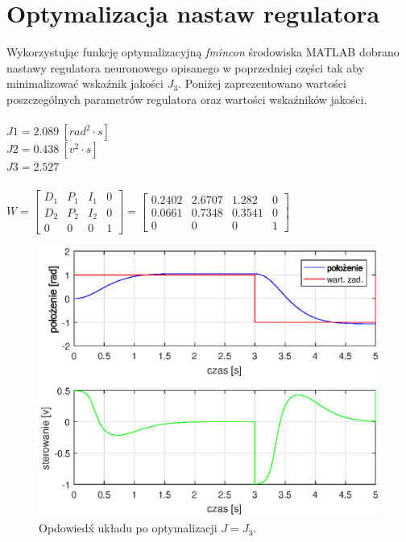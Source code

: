 \section{Optymalizacja nastaw regulatora}
Wykorzystując funkcję optymalizacyjną \textit{fmincon} środowiska MATLAB dobrano nastawy regulatora neuronowego opisanego w poprzedniej części tak aby minimalizować wska\'znik jakości $J_3$. 
Poniżej zaprezentowano wartości poszczególnych parametrów regulatora oraz wartości wska\'zników jakości. \\
\\
$J1 = 2.089 \ [rad^2 \cdot s]$\\
$J2 = 0.438 \ [v^2 \cdot s] $\\
$J3 = 2.527$ \\
\\
$W = \begin{bmatrix}
D_1& P_1& I_1&0\\
D_2& P_2& I_2&0\\
0&0&0&1
\end{bmatrix} = 
\begin{bmatrix}
0.2402&2.6707& 1.282&0\\
0.0661& 0.7348&0.3541&0\\
0&0&0&1
\end{bmatrix} 
$
\begin{figure}[h!]
	\centering
	\includegraphics[scale = 1]{fig/neural_opt.eps}
	\caption		
	{Opdowied\'x układu po optymalizacji $J = J_3$.}
	\label{neuron_ster_opt}
\end{figure}
\\
